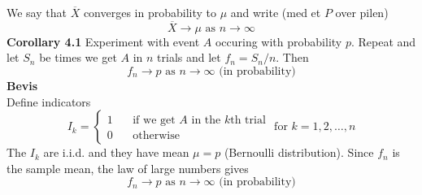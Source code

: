 \documentclass[12pt,a4paper]{report}
\begin{document}
We say that $\overline{X}$ converges in probability to $\mu$ and write (med et $P$ over pilen)
\begin{equation}
\overline{X}\to\mu\text{ as }n\to\infty
\end{equation}
\textbf{Corollary 4.1} Experiment with event $A$ occuring with probability $p$. Repeat and let $S_n$ be times we get $A$ in $n$ trials and let $f_n=S_n/n$. Then
\begin{equation}
f_n\to p\text{ as }n\to\infty\text{ (in probability)}
\end{equation}
\textbf{Bevis}\\
Define indicators
\begin{equation}
I_k=\begin{cases}
1\phantom{mm}\text{if we get $A$ in the $k$th trial}\\
0\phantom{mm}\text{otherwise}
\end{cases}\text{ for }k=1,2,\ldots,n
\end{equation}
The $I_k$ are i.i.d. and they have mean $\mu=p$ (Bernoulli distribution). Since $f_n$ is the sample mean, the law of large numbers gives
\begin{equation}
f_n\to p\text{ as }n\to\infty\text{ (in probability)}
\end{equation}
\end{document}
